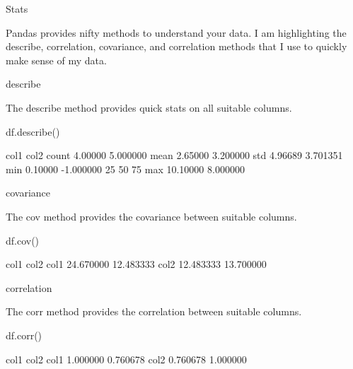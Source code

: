 
Stats

Pandas provides nifty methods to understand your data. I am highlighting the describe, correlation, covariance, and correlation methods that I use to quickly make sense of my data.


describe

The describe method provides quick stats on all suitable columns.


df.describe()

            col1      col2
count    4.00000  5.000000
mean     2.65000  3.200000
std      4.96689  3.701351
min      0.10000 -1.000000
25%
50%
75%
max     10.10000  8.000000



covariance

The cov method provides the covariance between suitable columns.


df.cov()

             col1       col2
col1    24.670000  12.483333
col2    12.483333  13.700000


correlation

The corr method provides the correlation between suitable columns.

df.corr()
  
             col1       col2
col1     1.000000   0.760678
col2     0.760678   1.000000


